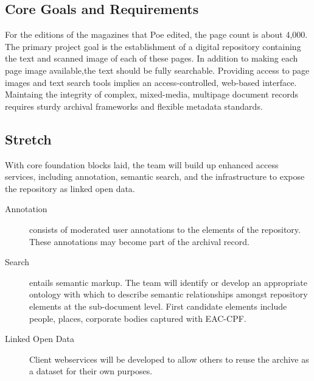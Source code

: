 \subsection{Core Goals and Requirements}
For the editions of the magazines that Poe edited, the page count is about 4,000. The primary project goal is the establishment of a digital repository containing the text and scanned image of each of these pages. In addition to making each page image available,the text should be fully searchable. Providing access to page images and text search tools implies an access-controlled, web-based interface. Maintaing the integrity of complex, mixed-media, multipage document records requires sturdy archival frameworks and flexible metadata standards. 


\subsection{Stretch}
With core foundation blocks laid, the team will build up enhanced access services, including annotation, semantic search, and the infrastructure to expose the repository as linked open data. 
\begin{description}
  \item[Annotation] consists of moderated user annotations to the elements of the repository. These annotations may become part of the archival record.   
  \item[Search] entails semantic markup. The team will identify or develop an appropriate ontology with which to describe semantic relationships amongst repository elements at the sub-document level. First candidate elements include people, places, corporate bodies captured with EAC-CPF. 
  \item[Linked Open Data] Client webservices will be developed  to allow others to reuse the archive as a dataset for their own purposes. 
\end{description}